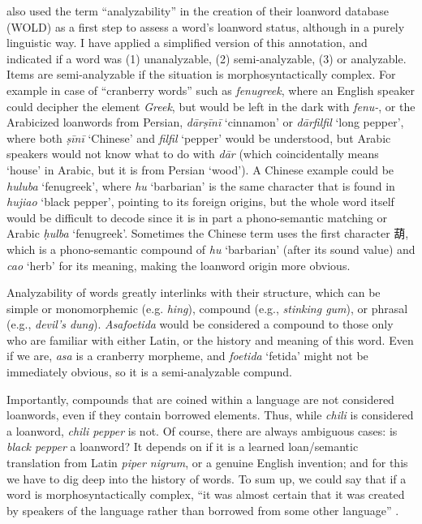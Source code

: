 \textcite[12]{haspelmath_loanwords_2009} also used the term ``analyzability'' in the creation of their loanword database (\gls{WOLD}) as a first step to assess a word's loanword status, although in a purely linguistic way. I have applied a simplified version of this annotation, and indicated if a word was (1) unanalyzable, (2) semi-analyzable, (3) or analyzable. Items are semi-analyzable if the situation is morphosyntactically complex. For example in case of ``cranberry words'' such as \textit{fenugreek}, where an English speaker could decipher the element \textit{Greek}, but would be left in the dark with \textit{fenu-}, or the Arabicized loanwords from Persian, \textit{dārṣīnī} `cinnamon' or \textit{dārfilfil} `long pepper', where both \textit{ṣīnī} `Chinese' and \textit{filfil} `pepper' would be understood, but Arabic speakers would not know what to do with \textit{dār} (which coincidentally means `house' in Arabic, but it is from Persian `wood'). A Chinese example could be \textit{huluba} `fenugreek', where \textit{hu} `barbarian' is the same character that is found in \textit{hujiao} `black pepper', pointing to its foreign origins, but the whole word itself would be difficult to decode since it is in part a phono-semantic matching or Arabic \textit{ḥulba} `fenugreek'. Sometimes the Chinese term uses the first character 葫, which is a phono-semantic compound of \textit{hu} `barbarian' (after its sound value) and \textit{cao} `herb' for its meaning, making the loanword origin more obvious. 

Analyzability of words greatly interlinks with their structure, which can be simple or monomorphemic (e.g. \textit{hing}), compound (e.g., \textit{stinking gum}), or phrasal (e.g., \textit{devil's dung}). \textit{Asafoetida} would be considered a compound to those only who are familiar with either Latin, or the history and meaning of this word. Even if we are, \textit{asa} is a cranberry morpheme, and \textit{foetida} `fetida' might not be immediately obvious, so it is a semi-analyzable compund. 

Importantly, compounds that are coined within a language are not considered loanwords, even if they contain borrowed elements. Thus, while \textit{chili} is considered a loanword, \textit{chili pepper} is not. Of course, there are always ambiguous cases: is \textit{black pepper} a loanword? It depends on if it is a learned loan/semantic translation from Latin \textit{piper nigrum}, or a genuine English invention; and for this we have to dig deep into the history of words. To sum up, we could say that if a word is morphosyntactically complex, ``it was almost certain that it was created by speakers of the language rather than borrowed from some other language'' \autocite[12]{haspelmath_loanwords_2009}. 

